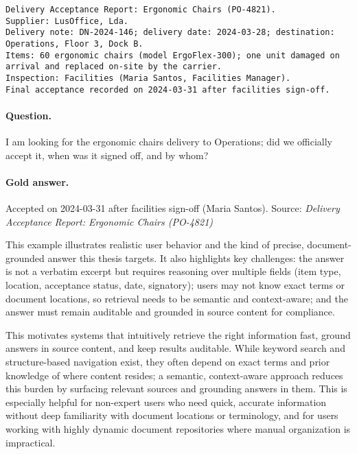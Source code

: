 \begin{lstlisting}[breaklines=true]
Delivery Acceptance Report: Ergonomic Chairs (PO-4821).
Supplier: LusOffice, Lda.
Delivery note: DN-2024-146; delivery date: 2024-03-28; destination: Operations, Floor 3, Dock B.
Items: 60 ergonomic chairs (model ErgoFlex-300); one unit damaged on arrival and replaced on-site by the carrier.
Inspection: Facilities (Maria Santos, Facilities Manager).
Final acceptance recorded on 2024-03-31 after facilities sign-off.
\end{lstlisting}

\paragraph{Question.} I am looking for the ergonomic chairs delivery to Operations; did we officially accept it, when was it signed off, and by whom?

\paragraph{Gold answer.} Accepted on 2024-03-31 after facilities sign-off (Maria Santos). Source: \textit{Delivery Acceptance Report: Ergonomic Chairs (PO-4821)}

This example illustrates realistic user behavior and the kind of precise, document-grounded answer this thesis targets. It also highlights key challenges: the answer is not a verbatim excerpt but requires reasoning over multiple fields (item type, location, acceptance status, date, signatory); users may not know exact terms or document locations, so retrieval needs to be semantic and context-aware; and the answer must remain auditable and grounded in source content for compliance.

This motivates systems that intuitively retrieve the right information fast, ground answers in source content, and keep results auditable. While keyword search and structure-based navigation exist, they often depend on exact terms and prior knowledge of where content resides; a semantic, context-aware approach reduces this burden by surfacing relevant sources and grounding answers in them. This is especially helpful for non-expert users who need quick, accurate information without deep familiarity with document locations or terminology, and for users working with highly dynamic document repositories where manual organization is impractical.

